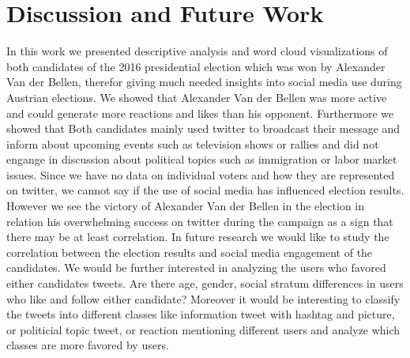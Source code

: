 \documentclass{llncs}
\begin{document}
\section{Discussion and Future Work}
In this work we presented descriptive analysis and word cloud visualizations of both candidates of the 2016 presidential election which was won by Alexander Van der Bellen, therefor giving much needed insights into social media use during Austrian elections. 
We showed that Alexander Van der Bellen was more active and could generate more reactions and likes than his opponent. Furthermore we showed that Both candidates mainly used twitter to broadcast their message and inform about upcoming events such as television shows or rallies and did not engange in discussion about political topics such as immigration or labor market issues.
Since we have no data on individual voters and how they are represented on twitter, we cannot say if the use of social media has influenced election results. However we see the victory of Alexander Van der Bellen in the election in relation his overwhelming success on twitter during the campaign as a sign that there may be at least correlation. In future research we would like to study the correlation between the election results and social media engagement of the candidates. 
We would be further interested in analyzing the users who favored either candidates tweets. Are there age, gender, social stratum differences in users who like and follow either candidate?
Moreover it would be interesting to classify the tweets into different classes like information tweet with hashtag and picture, or politicial topic tweet, or reaction mentioning different users and analyze which classes are more favored by users.
\end{document}
